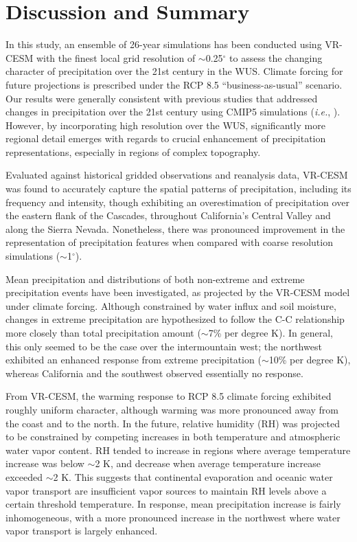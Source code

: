 \documentclass{ametsoc}
\begin{document}
\section{Discussion and Summary} \label{sec:Summary}

In this study, an ensemble of 26-year simulations has been conducted using VR-CESM with the finest local grid resolution of $\sim$0.25$^\circ$ to assess the changing character of precipitation over the 21st century in the WUS. Climate forcing for future projections is prescribed under the RCP 8.5 ``business-as-usual'' scenario. Our results were generally consistent with previous studies that addressed changes in precipitation over the 21st century using CMIP5 simulations (\textit{i.e.}, \cite{sillmann2013climate}). However, by incorporating high resolution over the WUS, significantly more regional detail emerges with regards to crucial enhancement of precipitation representations, especially in regions of complex topography.

Evaluated against historical gridded observations and reanalysis data, VR-CESM was found to accurately capture the spatial patterns of precipitation, including its frequency and intensity, though exhibiting an overestimation of precipitation over the eastern flank of the Cascades, throughout California's Central Valley and along the Sierra Nevada. Nonetheless, there was pronounced improvement in the representation of precipitation features when compared with coarse resolution simulations ($\sim$1$^\circ$).

Mean precipitation and distributions of both non-extreme and extreme precipitation events have been investigated, as projected by the VR-CESM model under climate forcing.  Although constrained by water influx and soil moisture, changes in extreme precipitation are hypothesized to follow the C-C relationship more closely than total precipitation amount ($\sim$7\% per degree K).  In general, this only seemed to be the case over the intermountain west; the northwest exhibited an enhanced response from extreme precipitation ($\sim$10\% per degree K), whereas California and the southwest observed essentially no response.

From VR-CESM, the warming response to RCP 8.5 climate forcing exhibited roughly uniform character, although warming was more pronounced away from the coast and to the north.  In the future, relative humidity (RH) was projected to be constrained by competing increases in both temperature and atmospheric water vapor content. RH tended to increase in regions where average temperature increase was below $\sim$2 K, and decrease when average temperature increase exceeded $\sim$2 K. This suggests that continental evaporation and oceanic water vapor transport are insufficient vapor sources to maintain RH levels above a certain threshold temperature.  In response, mean precipitation increase is fairly inhomogeneous, with a more pronounced increase in the northwest where water vapor transport is largely enhanced.
\end{document}
